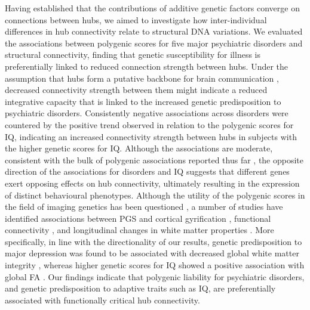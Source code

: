 Having established that the contributions of additive genetic factors converge on connections between hubs, we aimed to investigate how inter-individual differences in hub connectivity relate to structural DNA variations. We evaluated the associations between polygenic scores for five major psychiatric disorders and structural connectivity, finding that genetic susceptibility for illness is preferentially linked to reduced connection strength between hubs. Under the assumption that hubs form a putative backbone for brain communication \citep{Harriger2012,Towlson2013,VandenHeuvel2011,VandenHeuvel2013b}, decreased connectivity strength between them might indicate a reduced integrative capacity that is linked to the increased genetic predisposition to psychiatric disorders. Consistently negative associations across disorders were countered by the positive trend observed in relation to the polygenic scores for IQ, indicating an increased connectivity strength between hubs in subjects with the higher genetic scores for IQ. Although the associations are moderate, consistent with the bulk of polygenic associations reported thus far \citep{Alloza2018,Dezhina2018,Liu2016a,Sadeh2018,Wang2017}, the opposite direction of the associations for disorders and IQ suggests that different genes exert opposing effects on hub connectivity, ultimately resulting in the expression of distinct behavioural phenotypes. Although the utility of the polygenic scores in the field of imaging genetics has been questioned \citep{Reus2017}, a number of studies have identified associations between PGS and cortical gyrification \citep{Liu2016a}, functional connectivity \citep{Dezhina2018,Sadeh2018,Wang2017}, and longitudinal changes in white matter properties \citep{Alloza2018}. More specifically, in line with the directionality of our results, genetic predisposition to major depression was found to be associated with decreased global white matter integrity \citep{Whalley2013}, whereas higher genetic scores for IQ showed a positive association with global FA \citep{Jansen2018}. Our findings indicate that polygenic liability for psychiatric disorders, and genetic predisposition to adaptive traits such as IQ, are preferentially associated with functionally critical hub connectivity.

